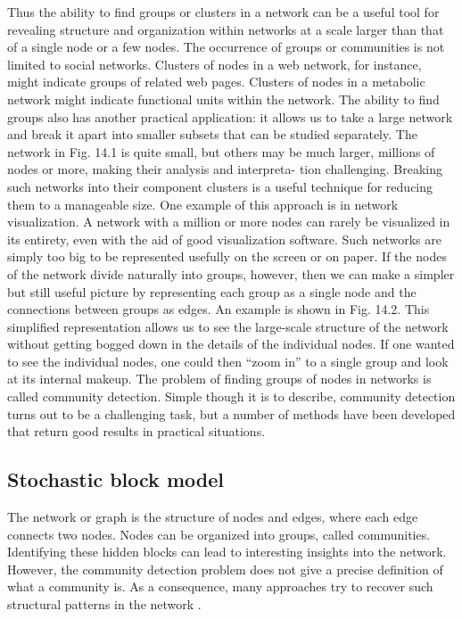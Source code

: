 Thus the ability to find groups or clusters in a network can be a useful tool for revealing structure and organization within networks at a scale larger than that of a single node or a
few nodes. The occurrence of groups or communities is not limited to social networks.
Clusters of nodes in a web network, for instance, might indicate groups of
related web pages. Clusters of nodes in a metabolic network might indicate
functional units within the network. The ability to find groups also has another practical application: it allows
us to take a large network and break it apart into smaller subsets that can be
studied separately. The network in Fig. 14.1 is quite small, but others may be
much larger, millions of nodes or more, making their analysis and interpreta-
tion challenging. Breaking such networks into their component clusters is a
useful technique for reducing them to a manageable size. One example of this
approach is in network visualization. A network with a million or more nodes
can rarely be visualized in its entirety, even with the aid of good visualization
software. Such networks are simply too big to be represented usefully on the
screen or on paper. If the nodes of the network divide naturally into groups,
however, then we can make a simpler but still useful picture by representing
each group as a single node and the connections between groups as edges.
An example is shown in Fig. 14.2. This simplified representation allows us to
see the large-scale structure of the network without getting bogged down in
the details of the individual nodes. If one wanted to see the individual nodes,
one could then “zoom in” to a single group and look at its internal makeup. The problem of finding groups of nodes in networks is called community
detection. Simple though it is to describe, community detection turns out to be
a challenging task, but a number of methods have been developed that return
good results in practical situations.


\subsection{Stochastic block model}
The network or graph is the structure of nodes and edges, where each edge connects two nodes. Nodes can be organized into groups, called communities. Identifying these hidden blocks can lead to interesting insights into the network. However, the community detection problem does not give a precise definition of what a community is. As a consequence, many approaches try to recover such structural patterns in the network \cite{martin}.

